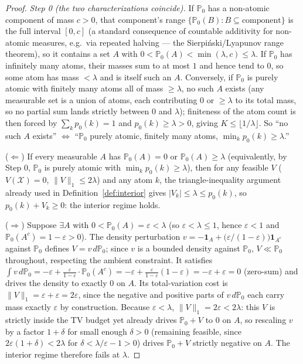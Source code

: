 \documentclass[11pt]{article}
\theoremstyle{plain}
\theoremstyle{definition}
\theoremstyle{remark}
\newcommand{\PP}{\mathbb{P}}
\newcommand{\cX}{\mathcal{X}}
\begin{document}
\begin{proof}
\emph{Step 0 (the two characterizations coincide).} If $\PP_0$ has a non-atomic
component of mass $c>0$, that component's range $\{\PP_0(B):B\subseteq\text{component}\}$
is the full interval $[0,c]$ (a standard consequence of countable additivity for
non-atomic measures, e.g.\ via repeated halving --- the Sierpi\'nski/Lyapunov range
theorem), so it contains a set $A$ with $0<\PP_0(A)<\min(\lambda,c)\le\lambda$. If
$\PP_0$ has infinitely many atoms, their masses sum to at most $1$ and hence tend to
$0$, so some atom has mass $<\lambda$ and is itself such an $A$. Conversely, if
$\PP_0$ is purely atomic with finitely many atoms all of mass $\ge\lambda$, no such
$A$ exists (any measurable set is a union of atoms, each contributing $0$ or
$\ge\lambda$ to its total mass, so no partial sum lands strictly between $0$ and
$\lambda$); finiteness of the atom count is then forced by $\sum_kp_0(k)=1$ and
$p_0(k)\ge\lambda>0$, giving $K\le\lfloor1/\lambda\rfloor$. So ``no such $A$ exists''
$\iff$ ``$\PP_0$ purely atomic, finitely many atoms, $\min_kp_0(k)\ge\lambda$.''

($\Leftarrow$) If every measurable $A$ has $\PP_0(A)=0$ or $\PP_0(A)\ge\lambda$
(equivalently, by Step 0, $\PP_0$ is purely atomic with $\min_kp_0(k)\ge\lambda$),
then for any feasible $V$ ($V(\cX)=0$, $\|V\|_1\le2\lambda$) and any atom $k$, the
triangle-inequality argument already used in Definition~\ref{def:interior} gives
$|V_k|\le\lambda\le p_0(k)$, so $p_0(k)+V_k\ge0$: the interior regime holds.

($\Rightarrow$) Suppose $\exists A$ with $0<\PP_0(A)=\varepsilon<\lambda$ (so
$\varepsilon<\lambda\le1$, hence $\varepsilon<1$ and $\PP_0(A^c)=1-\varepsilon>0$).
The density perturbation $v=-\mathbf1_A+\big(\varepsilon/(1-\varepsilon)\big)\mathbf1_{A^c}$
against $\PP_0$ defines $V=v\,d\PP_0$; since $v$ is a bounded density against
$\PP_0$, $V\ll\PP_0$ throughout, respecting the ambient constraint. It satisfies
$\int v\,d\PP_0=-\varepsilon+\frac{\varepsilon}{1-\varepsilon}\cdot\PP_0(A^c)=-\varepsilon+\frac{\varepsilon}{1-\varepsilon}(1-\varepsilon)=-\varepsilon+\varepsilon=0$
(zero-sum) and drives the density to exactly $0$ on $A$. Its total-variation cost is
$\|V\|_1=\varepsilon+\varepsilon=2\varepsilon$, since the negative and positive parts
of $v\,d\PP_0$ each carry mass exactly $\varepsilon$ by construction. Because
$\varepsilon<\lambda$, $\|V\|_1=2\varepsilon<2\lambda$: this $V$ is strictly inside
the TV budget yet already drives $\PP_0+V$ to $0$ on $A$, so rescaling $v$ by a
factor $1+\delta$ for small enough $\delta>0$ (remaining feasible, since
$2\varepsilon(1+\delta)<2\lambda$ for $\delta<\lambda/\varepsilon-1>0$) drives
$\PP_0+V$ strictly negative on $A$. The interior regime therefore fails at $\lambda$.
\end{proof}
\end{document}
